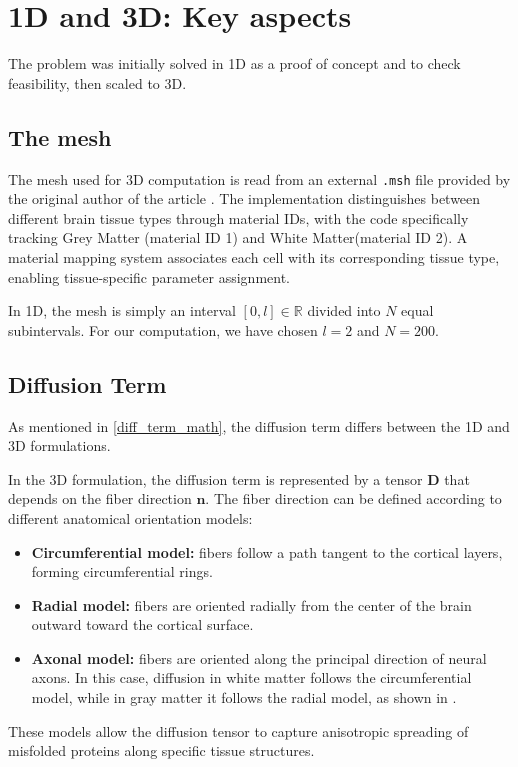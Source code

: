 \documentclass[12pt, a4paper, twoside, openright]{report}
\begin{document}
\section{1D and 3D: Key aspects}
The problem was initially solved in 1D as a proof of concept and to check feasibility, then scaled to 3D.
\subsection{The mesh}
The mesh used for 3D computation is read from an external \verb|.msh| file provided by the original author of the article \cite{WEICKENMEIER2019264}.
The implementation distinguishes between different brain tissue types through material IDs, with the code specifically tracking Grey Matter (material ID 1) and White Matter(material ID 2). A material mapping system associates each cell with its corresponding tissue type, enabling tissue-specific parameter assignment.

In 1D, the mesh is simply an interval $[0, l] \in \mathbb{R}$ divided into $N$ equal subintervals. For our computation, we have chosen $l=2$ and $N=200$.
\subsection{Diffusion Term}

As mentioned in \autoref{diff_term_math}, the diffusion term differs between the 1D and 3D formulations.

In the 3D formulation, the diffusion term is represented by a tensor \(\mathbf{D}\) that depends on the fiber direction \(\mathbf{n}\). The fiber direction can be defined according to different anatomical orientation models:
\begin{itemize}
  \item \textbf{Circumferential model:} fibers follow a path tangent to the cortical layers, forming circumferential rings.
  \item \textbf{Radial model:} fibers are oriented radially from the center of the brain outward toward the cortical surface.
  \item \textbf{Axonal model:} fibers are oriented along the principal direction of neural axons. In this case, diffusion in white matter follows the circumferential model, while in gray matter it follows the radial model, as shown in \cite{WEICKENMEIER2019264}.
\end{itemize}

These models allow the diffusion tensor to capture anisotropic spreading of misfolded proteins along specific tissue structures.
\end{document}
